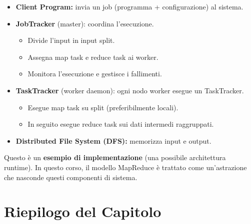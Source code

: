 \begin{itemize}
  \item \textbf{Client Program:} invia un job (programma + configurazione)
    al sistema.
  \item \textbf{JobTracker} (master): coordina l'esecuzione.
    \begin{itemize}
      \item Divide l'input in input split.
      \item Assegna map task e reduce task ai worker.
      \item Monitora l'esecuzione e gestisce i fallimenti.
    \end{itemize}
  \item \textbf{TaskTracker} (worker daemon): ogni nodo worker esegue un
    TaskTracker.
    \begin{itemize}
      \item Esegue map task su split (preferibilmente locali).
      \item In seguito esegue reduce task sui dati intermedi raggruppati.
    \end{itemize}
  \item \textbf{Distributed File System (DFS):} memorizza input e output.
\end{itemize}

\begin{importante}
  Questo è un \textbf{esempio di implementazione} (una possibile architettura
  runtime). In questo corso, il modello MapReduce è trattato come
  un'astrazione che nasconde questi componenti di sistema.
\end{importante}

\newpage
\section{Riepilogo del Capitolo}

